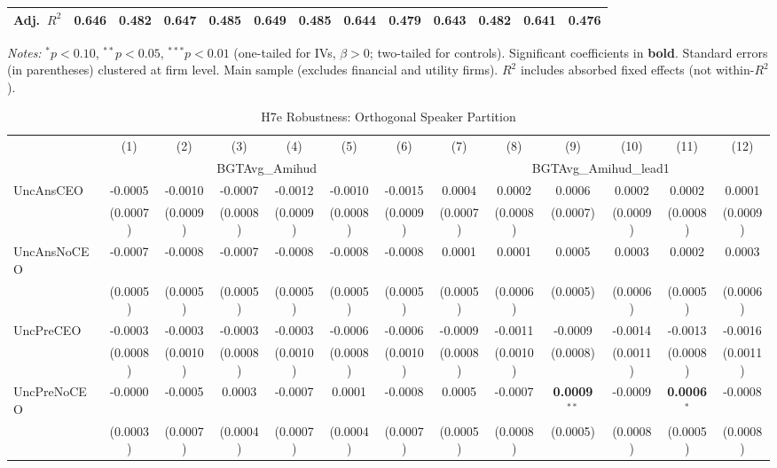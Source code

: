 \documentclass[11pt,a4paper]{article}
\begin{document}
\begin{table}[htbp]
\begin{tabular}{lcccccccccccc}
Adj.~$R^2$ & 0.646 & 0.482 & 0.647 & 0.485 & 0.649 & 0.485 & 0.644 & 0.479 & 0.643 & 0.482 & 0.641 & 0.476 \\
\bottomrule
\end{tabular}
\begin{minipage}{\linewidth}
\vspace{2pt}\scriptsize
\textit{Notes:} $^{*}p<0.10$, $^{**}p<0.05$, $^{***}p<0.01$ (one-tailed for IVs, $\beta > 0$; two-tailed for controls).
 Significant coefficients in \textbf{bold}.
 Standard errors (in parentheses) clustered at firm level.
 Main sample (excludes financial and utility firms).
 $R^2$ includes absorbed fixed effects (not within-$R^2$).
\end{minipage}
\end{table}
\clearpage
\begin{table}[htbp]
\centering
\caption{H7e Robustness: Orthogonal Speaker Partition}
\label{tab:h7e_robust}
\scriptsize
\begin{tabular}{lcccccccccccc}
\toprule
 & (1) & (2) & (3) & (4) & (5) & (6) & (7) & (8) & (9) & (10) & (11) & (12) \\
 & \multicolumn{6}{c}{BGTAvg\_Amihud} & \multicolumn{6}{c}{BGTAvg\_Amihud\_lead1} \\
\cmidrule(lr){2-7} \cmidrule(lr){8-13}
\midrule
UncAnsCEO & -0.0005 & -0.0010 & -0.0007 & -0.0012 & -0.0010 & -0.0015 & 0.0004 & 0.0002 & 0.0006 & 0.0002 & 0.0002 & 0.0001 \\
 & (0.0007) & (0.0009) & (0.0008) & (0.0009) & (0.0008) & (0.0009) & (0.0007) & (0.0008) & (0.0007) & (0.0009) & (0.0008) & (0.0009) \\
UncAnsNoCEO & -0.0007 & -0.0008 & -0.0007 & -0.0008 & -0.0008 & -0.0008 & 0.0001 & 0.0001 & 0.0005 & 0.0003 & 0.0002 & 0.0003 \\
 & (0.0005) & (0.0005) & (0.0005) & (0.0005) & (0.0005) & (0.0005) & (0.0005) & (0.0006) & (0.0005) & (0.0006) & (0.0005) & (0.0006) \\
UncPreCEO & -0.0003 & -0.0003 & -0.0003 & -0.0003 & -0.0006 & -0.0006 & -0.0009 & -0.0011 & -0.0009 & -0.0014 & -0.0013 & -0.0016 \\
 & (0.0008) & (0.0010) & (0.0008) & (0.0010) & (0.0008) & (0.0010) & (0.0008) & (0.0010) & (0.0008) & (0.0011) & (0.0008) & (0.0011) \\
UncPreNoCEO & -0.0000 & -0.0005 & 0.0003 & -0.0007 & 0.0001 & -0.0008 & 0.0005 & -0.0007 & \textbf{0.0009}$^{**}$ & -0.0009 & \textbf{0.0006}$^{*}$ & -0.0008 \\
 & (0.0003) & (0.0007) & (0.0004) & (0.0007) & (0.0004) & (0.0007) & (0.0005) & (0.0008) & (0.0005) & (0.0008) & (0.0005) & (0.0008) \\

\end{tabular}
\end{table}
\end{document}
